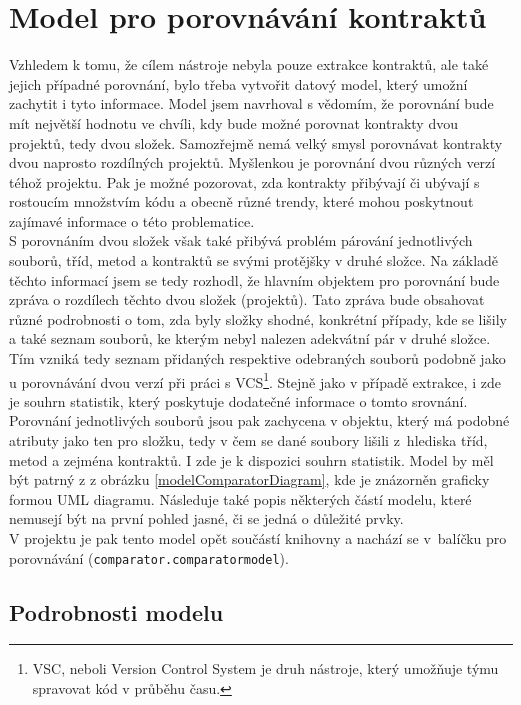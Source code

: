 	\section{Model pro porovnávání kontraktů}
		Vzhledem k tomu, že cílem nástroje nebyla pouze extrakce kontraktů, ale také jejich případné porovnání, bylo třeba vytvořit datový model, který umožní zachytit i tyto informace. Model jsem navrhoval s vědomím, že porovnání bude mít největší hodnotu ve chvíli, kdy bude možné porovnat kontrakty dvou projektů, tedy dvou složek. Samozřejmě nemá velký smysl porovnávat kontrakty dvou naprosto rozdílných projektů. Myšlenkou je porovnání dvou různých verzí téhož projektu. Pak je možné pozorovat, zda kontrakty přibývají či ubývají s rostoucím množstvím kódu a obecně různé trendy, které mohou poskytnout zajímavé informace o této problematice.\\ 
		
		S porovnáním dvou složek však také přibývá problém párování jednotlivých souborů, tříd, metod a kontraktů se svými protějšky v druhé složce. Na základě těchto informací jsem se tedy rozhodl, že hlavním objektem pro porovnání bude zpráva o rozdílech těchto dvou složek (projektů). Tato zpráva bude obsahovat různé podrobnosti o tom, zda byly složky shodné, konkrétní případy, kde se lišily a také seznam souborů, ke kterým nebyl nalezen adekvátní pár v druhé složce. Tím vzniká tedy seznam přidaných respektive odebraných souborů podobně jako u porovnávání dvou verzí při práci s VCS\footnote{VSC, neboli Version Control System je druh nástroje, který umožňuje týmu spravovat kód v průběhu času.}. Stejně jako v případě extrakce, i zde je souhrn statistik, který poskytuje dodatečné informace o tomto srovnání.\\
				
		Porovnání jednotlivých souborů jsou pak zachycena v objektu, který má podobné atributy jako ten pro složku, tedy v čem se dané soubory lišili z~hlediska tříd, metod a zejména kontraktů. I zde je k dispozici souhrn statistik. Model by měl být patrný z z obrázku \ref{modelComparatorDiagram}, kde je znázorněn graficky formou UML diagramu. Následuje také popis některých částí modelu, které nemusejí být na první pohled jasné, či se jedná o důležité prvky.\\
		
		V projektu je pak tento model opět součástí knihovny a nachází se v~balíčku pro porovnávání (\texttt{comparator.comparatormodel}).
		
				\subsection{Podrobnosti modelu}
				
